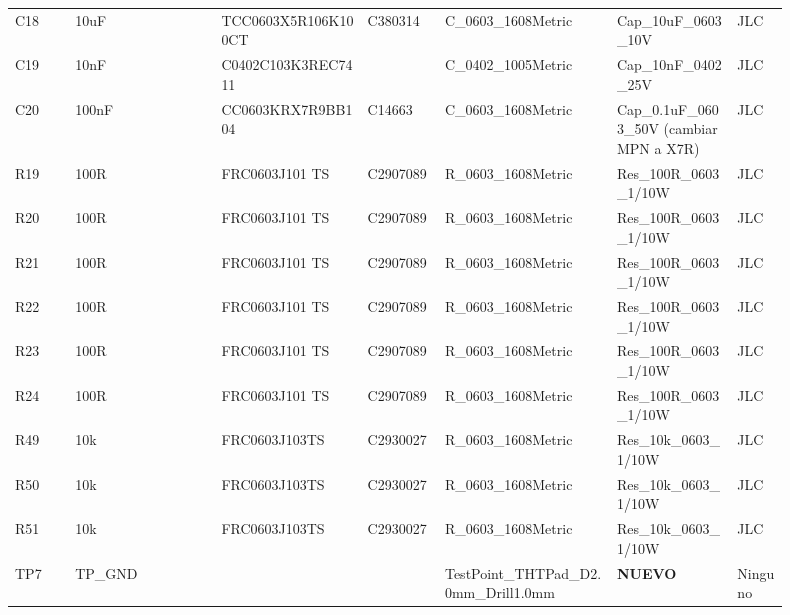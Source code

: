 \documentclass[10pt,a4paper]{article}
\begin{document}
{\begin{longtable}{@{}L{0.07\linewidth}L{0.17\linewidth}L{0.17\linewidth}L{0.09\linewidth}L{0.20\linewidth}L{0.14\linewidth}L{0.06\linewidth}@{}}
C18 & 10uF & TCC0603X5R106K100CT & C380314 & C\_\allowbreak{}0603\_\allowbreak{}1608Metric & Cap\_\allowbreak{}10uF\_\allowbreak{}0603\_\allowbreak{}10V & JLC\\
C19 & 10nF & C0402C103K3REC7411 &  & C\_\allowbreak{}0402\_\allowbreak{}1005Metric & Cap\_\allowbreak{}10nF\_\allowbreak{}0402\_\allowbreak{}25V & JLC\\
C20 & 100nF & CC0603KRX7R9BB104 & C14663 & C\_\allowbreak{}0603\_\allowbreak{}1608Metric & Cap\_\allowbreak{}0.1uF\_\allowbreak{}0603\_\allowbreak{}50V (cambiar MPN a X7R) & JLC\\
R19 & 100R & FRC0603J101 TS & C2907089 & R\_\allowbreak{}0603\_\allowbreak{}1608Metric & Res\_\allowbreak{}100R\_\allowbreak{}0603\_\allowbreak{}1/10W & JLC\\
R20 & 100R & FRC0603J101 TS & C2907089 & R\_\allowbreak{}0603\_\allowbreak{}1608Metric & Res\_\allowbreak{}100R\_\allowbreak{}0603\_\allowbreak{}1/10W & JLC\\
R21 & 100R & FRC0603J101 TS & C2907089 & R\_\allowbreak{}0603\_\allowbreak{}1608Metric & Res\_\allowbreak{}100R\_\allowbreak{}0603\_\allowbreak{}1/10W & JLC\\
R22 & 100R & FRC0603J101 TS & C2907089 & R\_\allowbreak{}0603\_\allowbreak{}1608Metric & Res\_\allowbreak{}100R\_\allowbreak{}0603\_\allowbreak{}1/10W & JLC\\
R23 & 100R & FRC0603J101 TS & C2907089 & R\_\allowbreak{}0603\_\allowbreak{}1608Metric & Res\_\allowbreak{}100R\_\allowbreak{}0603\_\allowbreak{}1/10W & JLC\\
R24 & 100R & FRC0603J101 TS & C2907089 & R\_\allowbreak{}0603\_\allowbreak{}1608Metric & Res\_\allowbreak{}100R\_\allowbreak{}0603\_\allowbreak{}1/10W & JLC\\
R49 & 10k & FRC0603J103TS & C2930027 & R\_\allowbreak{}0603\_\allowbreak{}1608Metric & Res\_\allowbreak{}10k\_\allowbreak{}0603\_\allowbreak{}1/10W & JLC\\
R50 & 10k & FRC0603J103TS & C2930027 & R\_\allowbreak{}0603\_\allowbreak{}1608Metric & Res\_\allowbreak{}10k\_\allowbreak{}0603\_\allowbreak{}1/10W & JLC\\
R51 & 10k & FRC0603J103TS & C2930027 & R\_\allowbreak{}0603\_\allowbreak{}1608Metric & Res\_\allowbreak{}10k\_\allowbreak{}0603\_\allowbreak{}1/10W & JLC\\
TP7 & TP\_\allowbreak{}GND &  &  & TestPoint\_\allowbreak{}THTPad\_\allowbreak{}D2.0mm\_\allowbreak{}Drill1.0mm & \textbf{NUEVO} & Ninguno\\
\bottomrule\end{longtable}}
\end{document}
